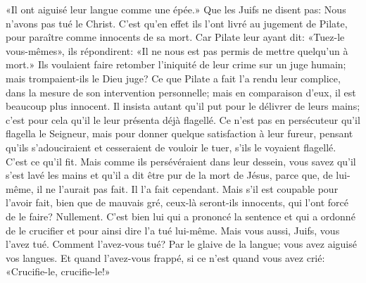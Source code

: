 «Il ont aiguisé leur langue comme une épée.»
Que les Juifs ne disent pas: Nous n’avons pas tué le Christ.
C’est qu’en effet ils l’ont livré au jugement de Pilate,
	pour paraître comme innocents de sa mort.
Car Pilate leur ayant dit: «Tuez-le vous-mêmes»,
	ils répondirent: «Il ne nous est pas permis de mettre quelqu’un à mort.»
Ils voulaient faire retomber l’iniquité de leur crime sur un juge humain;
	mais trompaient-ils le Dieu juge?
Ce que Pilate a fait l’a rendu leur complice,
	dans la mesure de son intervention personnelle;
	mais en comparaison d’eux, il est beaucoup plus innocent.
Il insista autant qu’il put pour le délivrer de leurs mains;
	c’est pour cela qu’il le leur présenta déjà flagellé.
Ce n’est pas en persécuteur qu’il flagella le Seigneur,
	mais pour donner quelque satisfaction à leur fureur,
	pensant qu’ils s’adouciraient et cesseraient de vouloir le tuer,
	s’ils le voyaient flagellé.
C'est ce qu’il fit.
Mais comme ils persévéraient dans leur dessein,
	vous savez qu’il s’est lavé les mains
	et qu’il a dit être pur de la mort de Jésus,
	parce que, de lui-même, il ne l’aurait pas fait.
Il l’a fait cependant.
	Mais s’il est coupable pour l’avoir fait, bien que de mauvais gré,
	ceux-là seront-ils innocents, qui l’ont forcé de le faire? Nullement.
C’est bien lui qui a prononcé la sentence et qui a ordonné de le crucifier
	et pour ainsi dire l’a tué lui-même.
Mais vous aussi, Juifs, vous l’avez tué.
Comment l’avez-vous tué? Par le glaive de la langue;
	vous avez aiguisé vos langues.
Et quand l’avez-vous frappé,
	si ce n’est quand vous avez crié: «Crucifie-le, crucifie-le!»
